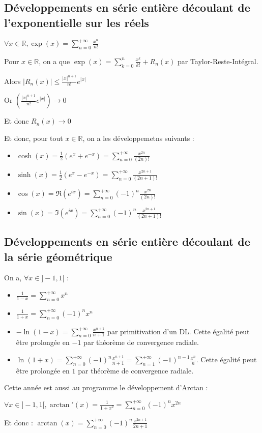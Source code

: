 \documentclass[a4paper,12pt]{book}
\newcommand{\Pre}[1]{\begin{tcolorbox}[sharp corners, colback=white,colframe=green!60!green!30!black!75, title=Preuve]#1\end{tcolorbox}}
\def\R{\mathbb{R}}
\begin{document}
\subsection{Développements en série entière découlant de l'exponentielle sur les réels}
$\forall x\in\R, \exp(x) = \sum\limits_{n=0}^{+\infty}\frac{x^n}{n!}$ \par \Pre{Pour $x\in\R$, on a que $\exp(x) = \sum\limits_{k=0}^{n}\frac{x^k}{k!}+R_n(x)$ par Taylor-Reste-Intégral. \par Alors $\vert R_n(x)\vert\leq \frac{\vert x\vert^{n+1}}{n!}e^{\vert x\vert}$ \par Or $\left(\frac{\vert x\vert^{n+1}}{n!}e^{\vert x\vert}\right)\to 0$ \par Et donc $R_n(x)\to 0$}
Et donc, pour tout $x\in\R$, on a les développemetns suivants :\begin{itemize}
\item $\cosh(x) = \frac{1}{2}(e^x +e^{-x}) = \sum\limits_{n=0}^{+\infty}\frac{x^{2n}}{(2n)!}$
\item $\sinh(x) = \frac{1}{2}(e^x-e^{-x}) =\sum\limits_{n=0}^{+\infty}\frac{x^{2n+1}}{(2n+1)!}$
\item $\cos(x)=\Re(e^{ix}) =\sum\limits_{n=0}^{+\infty}(-1)^n\frac{x^{2n}}{(2n)!}$
\item $\sin(x) = \Im(e^{ix})=\sum\limits_{n=0}^{+\infty}(-1)^n\frac{x^{2n+1}}{(2n+1)!}$
\end{itemize}
\subsection{Développements en série entière découlant de la série géométrique}
On a, $\forall x\in ]-1,1[$ :\begin{itemize}
\item $\frac{1}{1-x} = \sum\limits_{n=0}^{+\infty}x^n$
\item $\frac{1}{1+x} = \sum\limits_{n=0}^{+\infty}(-1)^nx^n$
\item $-\ln(1-x) = \sum\limits_{n=0}^{+\infty}\frac{x^{n+1}}{n+1}$ par primitivation d'un DL. Cette égalité peut être prolongée en $-1$ par théorème de convergence radiale.
\item $\ln(1+x) = \sum\limits_{n=0}^{+\infty}(-1)^n\frac{x^{n+1}}{n+1}=\sum\limits_{n=1}^{+\infty}(-1)^{n-1}\frac{x^n}{n}$. Cette égalité peut être prolongée en $1$ par théorème de convergence radiale.
\end{itemize}
Cette année est aussi au programme le développement d'Arctan :
\par $\forall x\in]-1,1[, \arctan'(x)=\frac{1}{1+x^2} =\sum\limits_{n=0}^{+\infty}(-1)^n x^{2n}$
\par Et donc : $\arctan(x) =\sum\limits_{n=0}^{+\infty}(-1)^n\frac{x^{2n+1}}{2n+1}$
\end{document}
